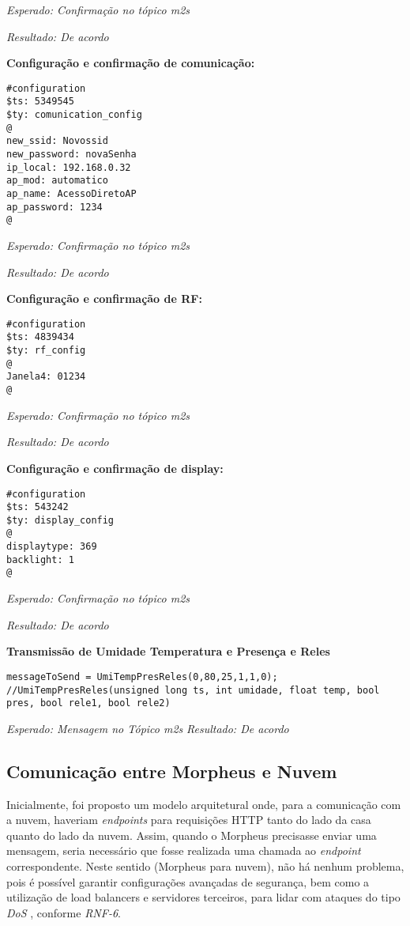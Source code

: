 \emph{Esperado: Confirmação no tópico \wmqtt{} m2s}

\emph{Resultado: De acordo}

\textbf{Configuração e confirmação de comunicação:}
\begin{lstlisting}
#configuration
$ts: 5349545
$ty: comunication_config
@
new_ssid: Novossid
new_password: novaSenha
ip_local: 192.168.0.32
ap_mod: automatico
ap_name: AcessoDiretoAP
ap_password: 1234
@
\end{lstlisting}

\emph{Esperado: Confirmação no tópico \wmqtt{} m2s}

\emph{Resultado: De acordo}

\textbf{Configuração e confirmação de RF:}
\begin{lstlisting}
#configuration
$ts: 4839434
$ty: rf_config
@
Janela4: 01234
@
\end{lstlisting}

\emph{Esperado: Confirmação no tópico \wmqtt{} m2s}

\emph{Resultado: De acordo}

\textbf{Configuração e confirmação de display:}
\begin{lstlisting}
#configuration
$ts: 543242
$ty: display_config
@
displaytype: 369
backlight: 1
@
\end{lstlisting}

\emph{Esperado: Confirmação no tópico \wmqtt{} m2s}

\emph{Resultado: De acordo}

\textbf{Transmissão de Umidade Temperatura e Presença e Reles}
\begin{lstlisting}
messageToSend = UmiTempPresReles(0,80,25,1,1,0);
//UmiTempPresReles(unsigned long ts, int umidade, float temp, bool pres, bool rele1, bool rele2)
\end{lstlisting}

\emph{Esperado: Mensagem no Tópico \wmqtt{} m2s}
\emph{Resultado: De acordo}


\subsection{Comunicação entre Morpheus e Nuvem}

Inicialmente, foi proposto um modelo arquitetural onde, para a comunicação com a nuvem, haveriam \emph{endpoints} para requisições HTTP tanto do lado da casa quanto do lado da nuvem. Assim, quando o Morpheus precisasse enviar uma mensagem, seria necessário que fosse realizada uma chamada ao \emph{endpoint} correspondente. Neste sentido (Morpheus para nuvem), não há nenhum problema, pois é possível garantir configurações avançadas de segurança, bem como a utilização de load balancers e servidores terceiros, para lidar com ataques do tipo \emph{DoS} \cite{akamai}, conforme \emph{RNF-6}.

